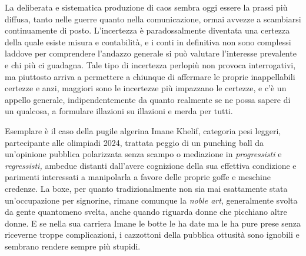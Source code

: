 \documentclass[
  letterpaper,
  DIV=11,
  numbers=noendperiod]{scrartcl}
\begin{document}
La deliberata e sistematica produzione di caos sembra oggi essere la
prassi più diffusa, tanto nelle guerre quanto nella comunicazione, ormai
avvezze a scambiarsi continuamente di posto. L'incertezza è
paradossalmente diventata una certezza della quale esiste misura e
contabilità, e i conti in definitiva non sono complessi laddove per
comprendere l'andazzo generale si può valutare l'interesse prevalente e
chi più ci guadagna. Tale tipo di incertezza perlopiù non provoca
interrogativi, ma piuttosto arriva a permettere a chiunque di affermare
le proprie inappellabili certezze e anzi, maggiori sono le incertezze
più impazzano le certezze, e c'è un appello generale, indipendentemente
da quanto realmente se ne possa sapere di un qualcosa, a formulare
illazioni su illazioni e merda per tutti.

Esemplare è il caso della pugile algerina Imane Khelif, categoria pesi
leggeri, partecipante alle olimpiadi 2024, trattata peggio di un
punching ball da un'opinione pubblica polarizzata senza scampo o
mediazione in \emph{progressisti} e \emph{regressisti,} ambedue distanti
dall'avere cognizione della sua effettiva condizione e parimenti
interessati a manipolarla a favore delle proprie goffe e meschine
credenze. La boxe, per quanto tradizionalmente non sia mai esattamente
stata un'occupazione per signorine, rimane comunque la \emph{noble art},
generalmente svolta da gente quantomeno svelta, anche quando riguarda
donne che picchiano altre donne. E se nella sua carriera Imane le botte
le ha date ma le ha pure prese senza riceverne troppe complicazioni, i
cazzottoni della pubblica ottusità sono ignobili e sembrano rendere
sempre più stupidi.
\end{document}
